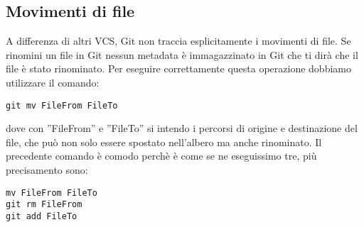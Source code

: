\subsection{Movimenti di file}
A differenza di altri VCS, Git non traccia esplicitamente i movimenti di file. Se rinomini un file in Git nessun metadata è immagazzinato in Git che ti dirà che il file è stato rinominato. Per eseguire correttamente questa operazione dobbiamo utilizzare il comando:

\begin{center}
\texttt{git mv FileFrom FileTo}
\end{center}

dove con ''FileFrom'' e ''FileTo'' si intendo i percorsi di origine e destinazione del file, che può non solo essere spostato nell'albero ma anche rinominato. Il precedente comando è comodo perchè è come se ne eseguissimo tre, più precisamento sono:

\begin{center}
\texttt{mv FileFrom FileTo}\\
\texttt{git rm FileFrom}\\
\texttt{git add FileTo}
\end{center}